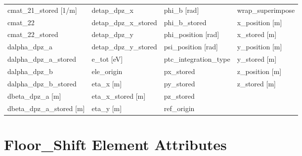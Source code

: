 \begin{tabular}{llll}
cmat_21_stored [1/m]             & detap_dpz_x                      & phi_b [rad]                      & wrap_superimpose                 \\
cmat_22                          & detap_dpz_x_stored               & phi_b_stored                     & x_position [m]                   \\
cmat_22_stored                   & detap_dpz_y                      & phi_position [rad]               & x_stored [m]                     \\
dalpha_dpz_a                     & detap_dpz_y_stored               & psi_position [rad]               & y_position [m]                   \\
dalpha_dpz_a_stored              & e_tot [eV]                       & ptc_integration_type             & y_stored [m]                     \\
dalpha_dpz_b                     & ele_origin                       & px_stored                        & z_position [m]                   \\
dalpha_dpz_b_stored              & eta_x [m]                        & py_stored                        & z_stored [m]                     \\
dbeta_dpz_a [m]                  & eta_x_stored [m]                 & pz_stored                        &                                  \\
dbeta_dpz_a_stored [m]           & eta_y [m]                        & ref_origin                       &                                  \\
 \bottomrule
 \end{tabular}
 \vfill
 
 \section{Floor_Shift Element Attributes}
 \label{s:list.floor.shift}
 
